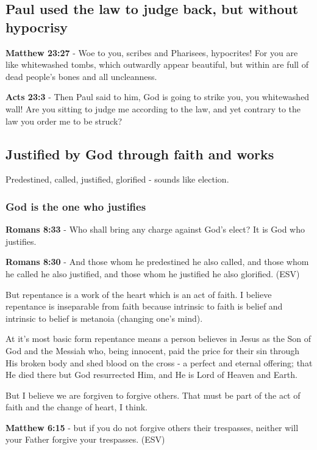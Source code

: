 \documentclass[11pt]{article}
\begin{document}
\subsection{Paul used the law to judge back, but without hypocrisy}
\label{sec:org6a9f9dc}
\textbf{Matthew 23:27} - Woe to you, scribes and Pharisees, hypocrites! For you are like whitewashed tombs, which outwardly appear beautiful, but within are full of dead people's bones and all uncleanness.

\textbf{Acts 23:3} - Then Paul said to him, God is going to strike you, you whitewashed wall! Are you sitting to judge me according to the law, and yet contrary to the law you order me to be struck?

\subsection{Justified by God through faith and works}
\label{sec:org9408f24}
Predestined, called, justified, glorified - sounds like election.
\subsubsection{God is the one who justifies}
\label{sec:orgfa39d53}

\textbf{Romans 8:33} - Who shall bring any charge against God's elect? It is God who justifies.

\textbf{Romans 8:30} - And those whom he predestined he also called, and those whom he called he also justified, and those whom he justified he also glorified. (ESV)

But repentance is a work of the heart which is an act of faith.
I believe repentance is inseparable from faith because intrinsic to faith is belief and intrinsic to belief is metanoia (changing one's mind).

At it's most basic form repentance means a person believes in Jesus as the Son of God and the Messiah who, being innocent, paid the price for their sin through His broken body and shed blood on the cross - a perfect and eternal offering; that He died there but God resurrected Him, and He is Lord of Heaven and Earth.

But I believe we are forgiven to forgive others. That must be part of the act of faith and the change of heart, I think.

\textbf{Matthew 6:15} - but if you do not forgive others their trespasses, neither will your Father forgive your trespasses. (ESV)
\end{document}
